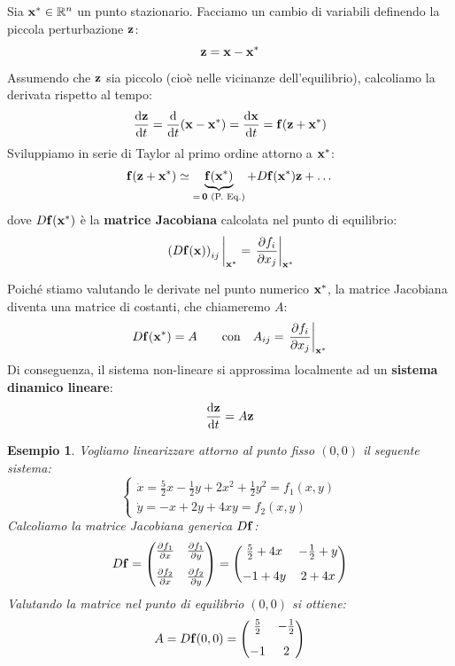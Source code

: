 \documentclass[openany]{book}
\newtheorem*{esempio}{Esempio}
\theoremstyle{definition}
\theoremstyle{remark}
\newcommand{\R}{\mathbb{R}}
\begin{document}
Sia $\vb{x}^* \in \R^n$ un punto stazionario. Facciamo un cambio di variabili definendo la piccola perturbazione $\vb{z}$:
\begin{equation}
    \vb{z} = \vb{x} - \vb{x}^*
\end{equation}
Assumendo che $\vb{z}$ sia piccolo (cioè nelle vicinanze dell'equilibrio), calcoliamo la derivata rispetto al tempo:
\begin{equation}
    \dv{\vb{z}}{t} = \dv{t}(\vb{x} - \vb{x}^*) = \dv{\vb{x}}{t} = \vb{f}(\vb{z} + \vb{x}^*)
\end{equation}
Sviluppiamo in serie di Taylor al primo ordine attorno a $\vb{x}^*$:
\begin{equation}
    \vb{f}(\vb{z} + \vb{x}^*) \simeq \underbrace{\vb{f}(\vb{x}^*)}_{=\, \vb{0} \text{ (P. Eq.)}} + D\vb{f}(\vb{x}^*)\vb{z} + \dots
\end{equation}
dove $D\vb{f}(\vb{x}^*)$ è la \textbf{matrice Jacobiana} calcolata nel punto di equilibrio:
$$ \eval{ \left( D\vb{f}(\vb{x}) \right)_{ij} }_{\vb{x}^*} = \eval{ \pdv{f_i}{x_j} }_{\vb{x}^*} $$

Poiché stiamo valutando le derivate nel punto numerico $\vb{x}^*$, la matrice Jacobiana diventa una matrice di costanti, che chiameremo $A$:
$$ D\vb{f}(\vb{x}^*) = A \qquad \text{con} \quad A_{ij} = \eval{ \pdv{f_i}{x_j} }_{\vb{x}^*} $$
Di conseguenza, il sistema non-lineare si approssima localmente ad un \textbf{sistema dinamico lineare}:
\begin{equation}
    \dv{\vb{z}}{t} = A\vb{z}
\end{equation}

\begin{esempio}
Vogliamo linearizzare attorno al punto fisso $(0,0)$ il seguente sistema:
\begin{equation*}
    \begin{cases}
        \dot{x} = \frac{5}{2}x - \frac{1}{2}y + 2x^2 + \frac{1}{2}y^2 = f_1(x,y) \\[4pt]
        \dot{y} = -x + 2y + 4xy = f_2(x,y)
    \end{cases}
\end{equation*}
Calcoliamo la matrice Jacobiana generica $D\vb{f}$:
$$ D\vb{f} = \begin{pmatrix} \pdv{f_1}{x} & \pdv{f_1}{y} \\[8pt] \pdv{f_2}{x} & \pdv{f_2}{y} \end{pmatrix} = \begin{pmatrix} \frac{5}{2} + 4x & -\frac{1}{2} + y \\[8pt] -1 + 4y & 2 + 4x \end{pmatrix} $$
Valutando la matrice nel punto di equilibrio $(0,0)$ si ottiene:
$$ A = D\vb{f}(0,0) = \begin{pmatrix} \frac{5}{2} & -\frac{1}{2} \\[8pt] -1 & 2 \end{pmatrix} $$
\end{esempio}
\end{document}
